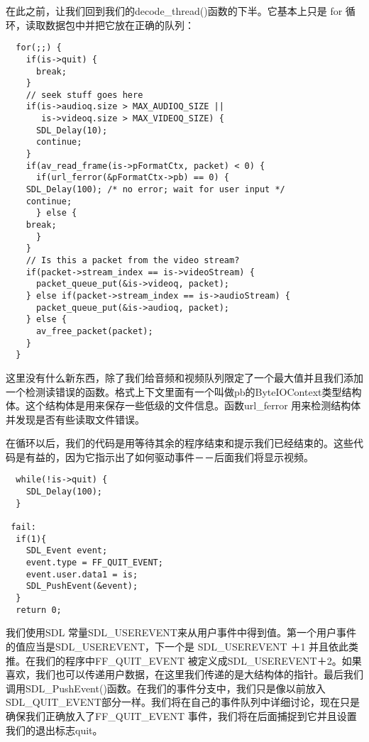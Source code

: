 在此之前，让我们回到我们的decode_thread()函数的下半。它基本上只是 for 循环，读取数据包中并把它放在正确的队列：
\begin{lstlisting}
  for(;;) {
    if(is->quit) {
      break;
    }
    // seek stuff goes here
    if(is->audioq.size > MAX_AUDIOQ_SIZE ||
       is->videoq.size > MAX_VIDEOQ_SIZE) {
      SDL_Delay(10);
      continue;
    }
    if(av_read_frame(is->pFormatCtx, packet) < 0) {
      if(url_ferror(&pFormatCtx->pb) == 0) {
    SDL_Delay(100); /* no error; wait for user input */
    continue;
      } else {
    break;
      }
    }
    // Is this a packet from the video stream?
    if(packet->stream_index == is->videoStream) {
      packet_queue_put(&is->videoq, packet);
    } else if(packet->stream_index == is->audioStream) {
      packet_queue_put(&is->audioq, packet);
    } else {
      av_free_packet(packet);
    }
  }
\end{lstlisting}

这里没有什么新东西，除了我们给音频和视频队列限定了一个最大值并且我们添加一个检测读错误的函数。格式上下文里面有一个叫做pb的ByteIOContext类型结构体。这个结构体是用来保存一些低级的文件信息。函数url_ferror 用来检测结构体并发现是否有些读取文件错误。

在循环以后，我们的代码是用等待其余的程序结束和提示我们已经结束的。这些代码是有益的，因为它指示出了如何驱动事件－－后面我们将显示视频。
\begin{lstlisting}
  while(!is->quit) {
    SDL_Delay(100);
  }

 fail:
  if(1){
    SDL_Event event;
    event.type = FF_QUIT_EVENT;
    event.user.data1 = is;
    SDL_PushEvent(&event);
  }
  return 0;
\end{lstlisting}

我们使用SDL 常量SDL_USEREVENT来从用户事件中得到值。第一个用户事件的值应当是SDL_USEREVENT，下一个是 SDL_USEREVENT ＋1 并且依此类推。在我们的程序中FF_QUIT_EVENT 被定义成SDL_USEREVENT＋2。如果喜欢，我们也可以传递用户数据，在这里我们传递的是大结构体的指针。最后我们调用SDL_PushEvent()函数。在我们的事件分支中，我们只是像以前放入SDL_QUIT_EVENT部分一样。我们将在自己的事件队列中详细讨论，现在只是确保我们正确放入了FF_QUIT_EVENT 事件，我们将在后面捕捉到它并且设置我们的退出标志quit。


